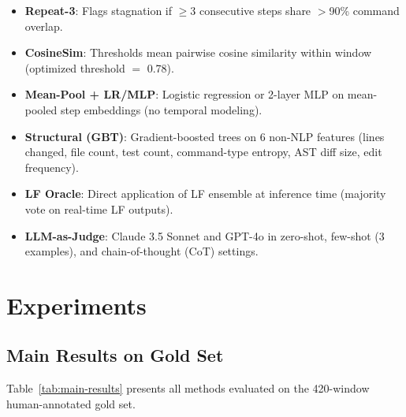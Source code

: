 \documentclass[11pt,a4paper]{article}
\begin{document}
\begin{itemize}
\item \textbf{Repeat-3}: Flags stagnation if $\geq$3 consecutive steps share $>$90\% command overlap.
\item \textbf{CosineSim}: Thresholds mean pairwise cosine similarity within window (optimized threshold $=$ 0.78).
\item \textbf{Mean-Pool + LR/MLP}: Logistic regression or 2-layer MLP on mean-pooled step embeddings (no temporal modeling).
\item \textbf{Structural (GBT)}: Gradient-boosted trees on 6 non-NLP features (lines changed, file count, test count, command-type entropy, AST diff size, edit frequency).
\item \textbf{LF Oracle}: Direct application of LF ensemble at inference time (majority vote on real-time LF outputs).
\item \textbf{LLM-as-Judge}: Claude 3.5 Sonnet and GPT-4o in zero-shot, few-shot (3 examples), and chain-of-thought (CoT) settings.
\end{itemize}

\section{Experiments}

\subsection{Main Results on Gold Set}

Table~\ref{tab:main-results} presents all methods evaluated on the 420-window human-annotated gold set.
\end{document}
